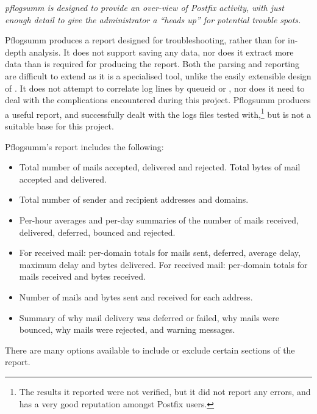\textit{pflogsumm is designed to provide an over-view of Postfix activity,
with just enough detail to give the administrator a ``heads up'' for
potential trouble spots.\/}

Pflogsumm produces a report designed for troubleshooting, rather than for
in-depth analysis.  It does not support saving any data, nor does it
extract more data than is required for producing the report.  Both the
parsing and reporting are difficult to extend as it is a specialised tool,
unlike the easily extensible design of \parsername{}.  It does not attempt
to correlate log lines by queueid or \pid{}, nor does it need to deal with
the complications encountered during this project.  Pflogsumm produces a
useful report, and successfully dealt with the \numberOFlogFILES{} logs
files tested with,\footnote{The results it reported were not verified, but
it did not report any errors, and has a very good reputation amongst
Postfix users.} but is not a suitable base for this project.

Pflogsumm's report includes the following:

\begin{itemize}

    \item Total number of mails accepted, delivered and rejected.  Total
        bytes of mail accepted and delivered.

    \item Total number of sender and recipient addresses and domains.

    \item Per-hour averages and per-day summaries of the number of mails
        received, delivered, deferred, bounced and rejected.

    \item For received mail: per-domain totals for mails sent, deferred,
        average delay, maximum delay and bytes delivered.  For received
        mail: per-domain totals for mails received and bytes received.

    \item Number of mails and bytes sent and received for each address.

    \item Summary of why mail delivery was deferred or failed, why mails
        were bounced, why mails were rejected, and warning messages.

\end{itemize}

There are many options available to include or exclude certain sections of
the report.

